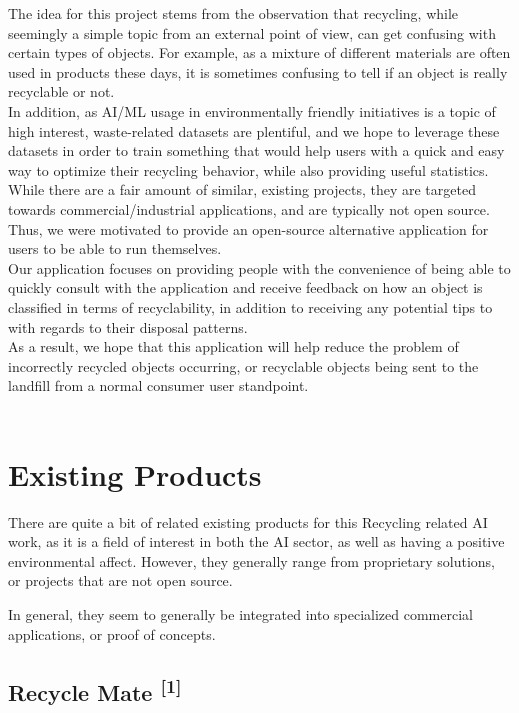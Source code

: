 \documentclass[conference]{IEEEtran}
\begin{document}
The idea for this project stems from the observation that recycling, while seemingly a simple topic from an external point of view, can get confusing with certain types of objects. For example, as a mixture of different materials are often used in products these days, it is sometimes confusing to tell if an object is really recyclable or not. \\
In addition, as AI/ML usage in environmentally friendly initiatives is a topic of high interest, waste-related datasets are plentiful, and we hope to leverage these datasets in order to train something that would help users with a quick and easy way to optimize their recycling behavior, while also providing useful statistics.\\

While there are a fair amount of similar, existing projects, they are targeted towards commercial/industrial applications, and are typically not open source. Thus, we were motivated to provide an open-source alternative application for users to be able to run themselves.\\

Our application focuses on providing people with the convenience of being able to quickly consult with the application and receive feedback on how an object is classified in terms of recyclability, in addition to receiving any potential tips to with regards to their disposal patterns. \\
As a result, we hope that this application will help reduce the problem of incorrectly recycled objects occurring, or recyclable objects being sent to the landfill from a normal consumer user standpoint. \\~\\

\section{Existing Products}

There are quite a bit of related existing products for this Recycling related AI work, as it is a field of interest in both the AI sector, as well as having a positive environmental affect. However, they generally range from proprietary solutions, or projects that are not open source.

In general, they seem to generally be integrated into specialized commercial applications, or proof of concepts.
\newline

\subsection{Recycle Mate \textsuperscript{[1]}}
\end{document}
